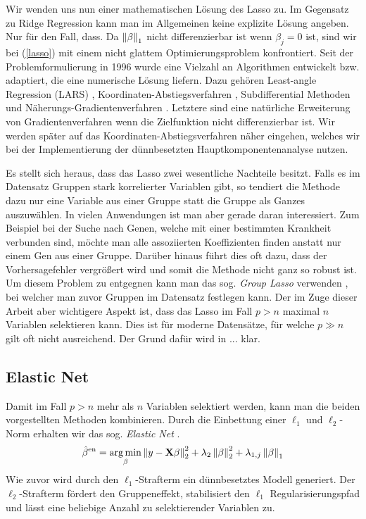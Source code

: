 Wir wenden uns nun einer mathematischen Lösung des Lasso zu. Im Gegensatz zu Ridge Regression kann man im Allgemeinen keine explizite Lösung angeben. Nur für den Fall, dass.
Da $\left\lVert \beta \right\rVert_1$ nicht differenzierbar ist wenn $\beta_j = 0$ ist, sind wir bei (\ref{lasso}) mit einem nicht glattem Optimierungsproblem konfrontiert. Seit der Problemformulierung in 1996 wurde eine Vielzahl an Algorithmen entwickelt bzw. adaptiert, die eine numerische Lösung liefern. Dazu gehören Least-angle Regression (LARS) \cite{efron_lars}, Koordinaten-Abstiegsverfahren \cite{friedman}, Subdifferential Methoden und  Näherungs-Gradientenverfahren \cite{yang, vandenberghe}. Letztere sind eine natürliche Erweiterung von Gradientenverfahren wenn die Zielfunktion nicht differenzierbar ist. Wir werden später auf das Koordinaten-Abstiegsverfahren näher eingehen, welches wir bei der Implementierung der dünnbesetzten Hauptkomponentenanalyse nutzen.

Es stellt sich heraus, dass das Lasso zwei wesentliche Nachteile besitzt. Falls es im Datensatz Gruppen stark korrelierter Variablen gibt, so tendiert die Methode dazu nur eine Variable aus einer Gruppe statt die Gruppe als Ganzes auszuwählen. In vielen Anwendungen ist man aber gerade daran interessiert. Zum Beispiel bei der Suche nach Genen, welche mit einer bestimmten Krankheit verbunden sind, möchte man alle assoziierten Koeffizienten finden anstatt nur einem Gen aus einer Gruppe. Darüber hinaus führt dies oft dazu, dass der Vorhersagefehler vergrößert wird und somit die Methode nicht ganz so robust ist. Um diesem Problem zu entgegnen kann man das sog. \textit{Group Lasso} verwenden \cite{yuan}, bei welcher man zuvor Gruppen im Datensatz festlegen kann. Der im Zuge dieser Arbeit aber wichtigere Aspekt ist, dass das Lasso im Fall $p > n$ maximal $n$ Variablen selektieren kann. Dies ist für moderne Datensätze, für welche $p \gg n$ gilt oft nicht ausreichend. Der Grund dafür wird in ... klar.\\

\subsection{Elastic Net}

Damit im Fall $p > n$ mehr als $n$ Variablen selektiert werden, kann man die beiden vorgestellten Methoden kombinieren. Durch die Einbettung einer $\ell_1$ und $\ell_2$-Norm erhalten wir das sog. \textit{Elastic Net} \cite{zou_elasticnet}.
\begin{align}
\label{elastic_net}
\hat{\beta}^{\text{en}} = \operatorname*{arg\,min}_{\beta} \left\lVert y - \mathbf{X} \beta \right\rVert_2^2 + \lambda_2 \left\lVert \beta \right\rVert_{2}^{2} + \lambda_{1,j} \left\lVert \beta \right\rVert_{1}
\end{align}
Wie zuvor wird durch den $\ell_1$-Strafterm ein dünnbesetztes Modell generiert. Der $\ell_2$-Strafterm fördert den Gruppeneffekt, stabilisiert den $\ell_1$ Regularisierungspfad und lässt eine beliebige Anzahl zu selektierender Variablen zu.

